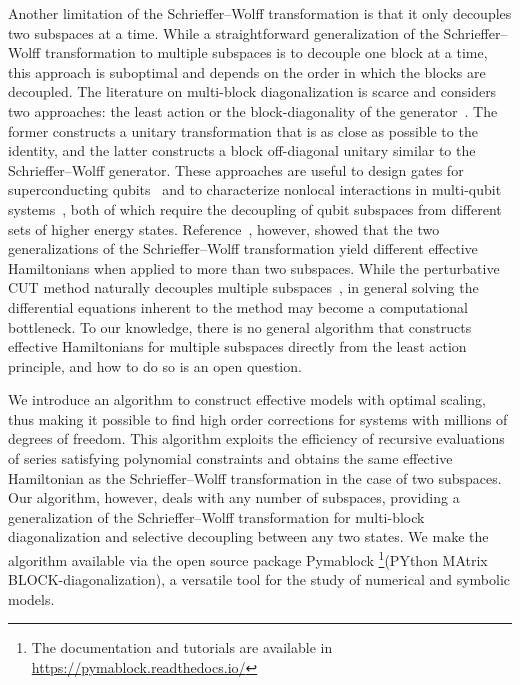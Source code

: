 Another limitation of the Schrieffer--Wolff transformation is that it only decouples two subspaces at a time.
While a straightforward generalization of the Schrieffer--Wolff transformation to multiple subspaces is to decouple one block at a time, this approach is suboptimal and depends on the order in which the blocks are decoupled.
The literature on multi-block diagonalization is scarce and considers two approaches: the least action or the block-diagonality of the generator~\cite{Mankodi_2024}.
The former constructs a unitary transformation that is as close as possible to the identity, and the latter constructs a block off-diagonal unitary similar to the Schrieffer--Wolff generator.
These approaches are useful to design gates for superconducting qubits~\cite{Magesan_2020} and to characterize nonlocal interactions in multi-qubit systems~\cite{Xu_2024a}, both of which require the decoupling of qubit subspaces from different sets of higher energy states.
Reference~\cite{Mankodi_2024}, however, showed that the two generalizations of the Schrieffer--Wolff transformation yield different effective Hamiltonians when applied to more than two subspaces.
While the perturbative CUT method naturally decouples multiple subspaces~\cite{Knetter_2003}, in general solving the differential equations inherent to the method may become a computational bottleneck.
To our knowledge, there is no general algorithm that constructs effective Hamiltonians for multiple subspaces directly from the least action principle, and how to do so is an open question.

We introduce an algorithm to construct effective models with optimal scaling, thus making it possible to find high order corrections for systems with millions of degrees of freedom.
This algorithm exploits the efficiency of recursive evaluations of series satisfying polynomial constraints and obtains the same effective Hamiltonian as the Schrieffer--Wolff transformation in the case of two subspaces.
Our algorithm, however, deals with any number of subspaces, providing a generalization of the Schrieffer--Wolff transformation for multi-block diagonalization and selective decoupling between any two states.
We make the algorithm available via the open source package Pymablock \footnote{The documentation and tutorials are available in \url{https://pymablock.readthedocs.io/}}(PYthon MAtrix BLOCK-diagonalization), a versatile tool for the study of numerical and symbolic models.
